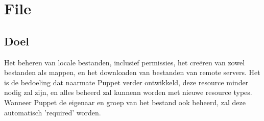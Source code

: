 \section{File}

\subsection{Doel}
Het beheren van locale bestanden, inclusief permissies, het cre\"{e}ren van zowel bestanden als mappen, en het downloaden van bestanden van remote servers. Het is de bedoeling dat naarmate Puppet verder ontwikkeld, deze resource minder nodig zal zijn, en alles beheerd zal kunnenn worden met nieuwe resource types. Wanneer Puppet de eigenaar en groep van het bestand ook beheerd, zal deze automatisch 'required' worden.\\\\
%
